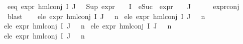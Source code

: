 \begin{isabellebody}
\ e{}{\isacharunderscore}{\kern0pt}eq{\isacharcolon}{\kern0pt}\ {\isachardoublequoteopen}expr{\isacharunderscore}{\kern0pt}{}\ {\isacharparenleft}{\kern0pt}hml{\isacharunderscore}{\kern0pt}conj\ I\ J\ {\isasymPhi}{\isacharparenright}{\kern0pt}\ {\isacharequal}{\kern0pt}\ {\isacharparenleft}{\kern0pt}Sup\ {\isacharparenleft}{\kern0pt}{\isacharparenleft}{\kern0pt}expr{\isacharunderscore}{\kern0pt}{}\ {\isasymcirc}\ {\isasymPhi}{\isacharparenright}{\kern0pt}\ {\isacharbackquote}{\kern0pt}\ I\ {\isasymunion}\ {\isacharparenleft}{\kern0pt}{\isacharparenleft}{\kern0pt}eSuc\ {\isasymcirc}\ expr{\isacharunderscore}{\kern0pt}{}\ {\isasymcirc}\ {\isasymPhi}{\isacharparenright}{\kern0pt}\ {\isacharbackquote}{\kern0pt}\ J{\isacharparenright}{\kern0pt}{\isacharparenright}{\kern0pt}{\isacharparenright}{\kern0pt}{\isachardoublequoteclose}\isanewline
\ \ \ \ \isamarkupfalse%
\ expr{\isacharunderscore}{\kern0pt}{}{\isacharunderscore}{\kern0pt}conj\ \isamarkupfalse%
\ blast\isanewline
\isanewline
\ \ \isamarkupfalse%
\ e{}{\isacharunderscore}{\kern0pt}le{\isacharcolon}{\kern0pt}\ {\isachardoublequoteopen}expr{\isacharunderscore}{\kern0pt}{}\ {\isacharparenleft}{\kern0pt}hml{\isacharunderscore}{\kern0pt}conj\ I\ J\ {\isasymPhi}{\isacharparenright}{\kern0pt}\ {\isasymle}\ n{}{\isachardoublequoteclose}\ \isanewline
e{}{\isacharunderscore}{\kern0pt}le{\isacharcolon}{\kern0pt}\ {\isachardoublequoteopen}expr{\isacharunderscore}{\kern0pt}{}\ {\isacharparenleft}{\kern0pt}hml{\isacharunderscore}{\kern0pt}conj\ I\ J\ {\isasymPhi}{\isacharparenright}{\kern0pt}\ {\isasymle}\ n{}{\isachardoublequoteclose}\ \isanewline
e{}{\isacharunderscore}{\kern0pt}le{\isacharcolon}{\kern0pt}\ {\isachardoublequoteopen}expr{\isacharunderscore}{\kern0pt}{}\ {\isacharparenleft}{\kern0pt}hml{\isacharunderscore}{\kern0pt}conj\ I\ J\ {\isasymPhi}{\isacharparenright}{\kern0pt}\ {\isasymle}\ n{}{\isachardoublequoteclose}\ \isanewline
e{}{\isacharunderscore}{\kern0pt}le{\isacharcolon}{\kern0pt}\ {\isachardoublequoteopen}expr{\isacharunderscore}{\kern0pt}{}\ {\isacharparenleft}{\kern0pt}hml{\isacharunderscore}{\kern0pt}conj\ I\ J\ {\isasymPhi}{\isacharparenright}{\kern0pt}\ {\isasymle}\ n{}{\isachardoublequoteclose}\ \isanewline
e{}{\isacharunderscore}{\kern0pt}le{\isacharcolon}{\kern0pt}\ {\isachardoublequoteopen}expr{\isacharunderscore}{\kern0pt}{}\ {\isacharparenleft}{\kern0pt}hml{\isacharunderscore}{\kern0pt}conj\ I\ J\ {\isasymPhi}{\isacharparenright}{\kern0pt}\ {\isasymle}\ n{}{\isachardoublequoteclose}\ \isanewline

\end{isabellebody}
